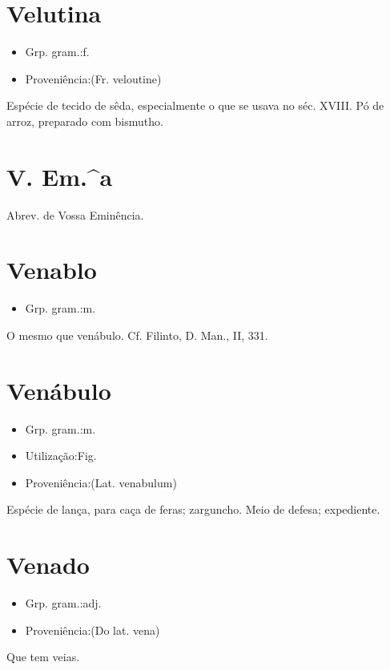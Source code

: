 \documentclass{article}
\begin{document}
\section{Velutina}
\begin{itemize}
\item {Grp. gram.:f.}
\end{itemize}
\begin{itemize}
\item {Proveniência:(Fr. \textunderscore veloutine\textunderscore )}
\end{itemize}
Espécie de tecido de sêda, especialmente o que se usava no séc. XVIII.
Pó de arroz, preparado com bismutho.
\section{V. Em.^a}
Abrev. de \textunderscore Vossa Eminência\textunderscore .
\section{Venablo}
\begin{itemize}
\item {Grp. gram.:m.}
\end{itemize}
O mesmo que \textunderscore venábulo\textunderscore . Cf. Filinto, \textunderscore D. Man.\textunderscore , II, 331.
\section{Venábulo}
\begin{itemize}
\item {Grp. gram.:m.}
\end{itemize}
\begin{itemize}
\item {Utilização:Fig.}
\end{itemize}
\begin{itemize}
\item {Proveniência:(Lat. \textunderscore venabulum\textunderscore )}
\end{itemize}
Espécie de lança, para caça de feras; zarguncho.
Meio de defesa; expediente.
\section{Venado}
\begin{itemize}
\item {Grp. gram.:adj.}
\end{itemize}
\begin{itemize}
\item {Proveniência:(Do lat. \textunderscore vena\textunderscore )}
\end{itemize}
Que tem veias.
\end{document}
